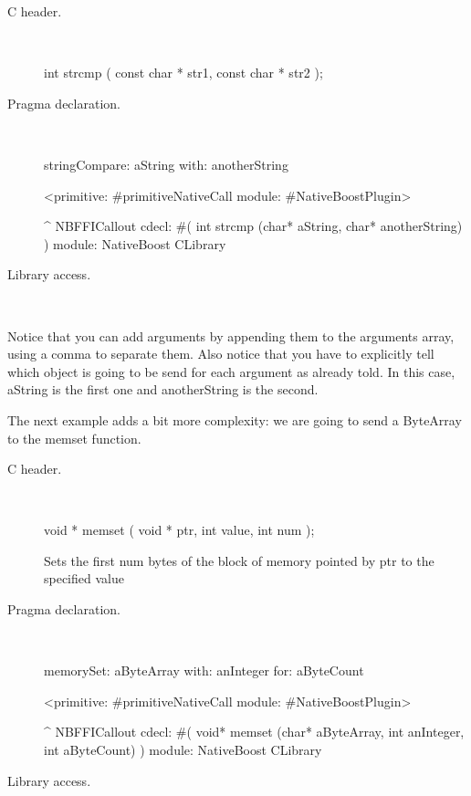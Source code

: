 \documentclass[a4paper,10pt,twoside]{book}
\begin{document}
\begin{description}
\item [C header.] \ 

\begin{code}{}
int strcmp ( const char * str1, const char * str2 );
\end{code}

\item [Pragma declaration.] \ 

\begin{code}{}
stringCompare: aString with: anotherString

	<primitive: #primitiveNativeCall module: #NativeBoostPlugin>
	
	^ NBFFICallout cdecl: #( int strcmp (char* aString, char* anotherString) ) module: NativeBoost CLibrary
\end{code}


\item [Library access.] \ 
 

\end{description}

Notice that you can add arguments by appending them to the arguments array,
using a comma to separate them. Also notice that you have to explicitly tell
which object is going to be send for each argument as already told. In this case, aString is
the first one and anotherString is the second.

The next example adds a bit more complexity: we are going to send a ByteArray
to the memset function. 

\begin{description}
\item [C header.] \ 

\begin{code}{}
void * memset ( void * ptr, int value, int num );
\end{code}
Sets the first num bytes of the block of memory pointed by ptr to the specified value

\item [Pragma declaration.] \ 

\begin{code}{}
memorySet: aByteArray with: anInteger for: aByteCount

	<primitive: #primitiveNativeCall module: #NativeBoostPlugin>
	
	^ NBFFICallout cdecl: #( void* memset (char* aByteArray, int anInteger, int aByteCount) ) module: NativeBoost CLibrary
\end{code}


\item [Library access.] \ 
 

\end{description}
\end{document}
